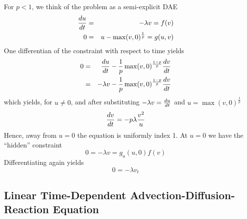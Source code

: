 \documentclass[10pt,dvips,twoside,reqno]{amsart}
\begin{document}
For $p<1$, we think of the problem as a semi-explicit DAE
\begin{eqnarray}
\frac{d {u}}{d {t}}&=& -\lambda v = f(v)\\
0 &=& u - \max(v,0)^{\frac{1}{p}} = g(u,v)
\end{eqnarray}
One differentian of the constraint with respect to time yields
\begin{eqnarray}
0 &=& \frac{d {u}}{d {t}} - \frac{1}{p} \max(v,0)^{\frac{1-p}{p}} \frac{d {v}}{d {t}} \\
&=& -\lambda v - \frac{1}{p} \max(v,0)^{\frac{1-p}{p}} \frac{d {v}}{d {t}} \\
\end{eqnarray}
which yields, for $u \neq 0$, and after substituting $-\lambda v =
\frac{d {u}}{d {t}}$ and $u = \max(v,0)^{\frac{1}{p}}$
\begin{equation}
\frac{d {v}}{d {t}} = - p \lambda \frac{v^2}{u} 
\end{equation}
Hence, away from $u = 0$ the equation is uniformly index 1. At $u=0$
we have the ``hidden'' constraint
\begin{equation}
0 = -\lambda v = g_u(u,0) f(v) 
\end{equation}
Differentiating again yields
\begin{equation}
0= -\lambda v_t 
\end{equation}
\subsection{Linear Time-Dependent Advection-Diffusion-Reaction Equation}
\end{document}
